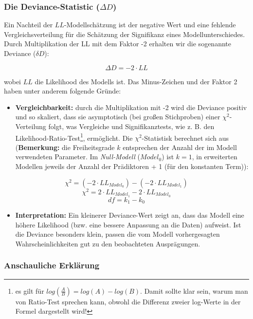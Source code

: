\documentclass[
]{article}
\providecommand{\tightlist}{%
  \setlength{\itemsep}{0pt}\setlength{\parskip}{0pt}}
\begin{document}
\subsubsection{\texorpdfstring{Die Deviance-Statistic (\(\Delta D\))}{Die Deviance-Statistic (\textbackslash Delta D)}}\label{die-deviance-statistic-delta-d}

Ein Nachteil der \(LL\)-Modellschätzung ist der negative Wert und eine fehlende Vergleichsverteilung für die Schätzung der Signifikanz eines Modellunterschiedes. Durch Multiplikation der LL mit dem Faktor -2 erhalten wir die sogenannte Deviance (\(\delta D\)):

\[\Delta D= -2 \cdot LL\]

wobei \(LL\) die Likelihood des Modells ist. Das Minus-Zeichen und der Faktor 2 haben unter anderem folgende Gründe:

\begin{itemize}
\tightlist
\item
  \textbf{Vergleichbarkeit:} durch die Multiplikation mit -2 wird die Deviance positiv und so skaliert, dass sie asymptotisch (bei großen Stichproben) einer \(\chi^2\)-Verteilung folgt, was Vergleiche und Signifikanztests, wie z. B. den Likelihood-Ratio-Test\footnote{es gilt für \(log \left( \frac{A}{B} \right) = log(A) - log(B)\). Damit sollte klar sein, warum man von Ratio-Test sprechen kann, obwohl die Differenz zweier log-Werte in der Formel dargestellt wird!}, ermöglicht. Die \(\chi^2\)-Statistisk berechnet sich aus (\textbf{Bemerkung:} die Freiheitsgrade \(k\) entsprechen der Anzahl der im Modell verwendeten Parameter. Im \emph{Null-Modell} (\(Model_0\)) ist \(k = 1\), in erweiterten Modellen jeweils der Anzahl der Prädiktoren + 1 (für den konstanten Term)):
\end{itemize}

\[\chi^2 = (-2 \cdot LL_{Model_0}) - (-2 \cdot LL_{Model_1})\]
\[\chi^2 = 2 \cdot LL_{Model_1} - 2 \cdot LL_{Model_0}\]
\[df = k_1 - k_0\]

\begin{itemize}
\tightlist
\item
  \textbf{Interpretation:} Ein kleinerer Deviance-Wert zeigt an, dass das Modell eine höhere Likelihood (bzw. eine bessere Anpassung an die Daten) aufweist. Ist die Deviance besonders klein, passen die vom Modell vorhergesagten Wahrscheinlichkeiten gut zu den beobachteten Ausprägungen.
\end{itemize}

\subsubsection{Anschauliche Erklärung}\label{anschauliche-erkluxe4rung}
\end{document}
